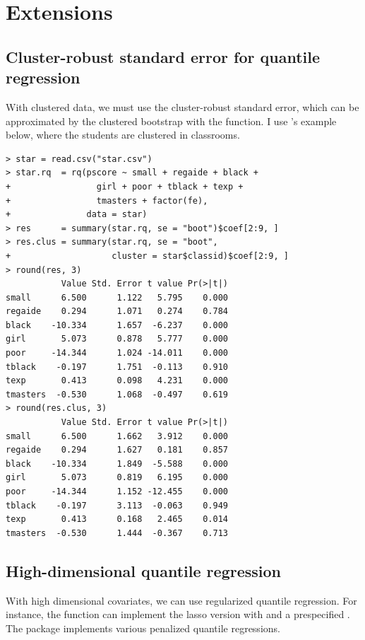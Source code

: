  



\section{Extensions}


\subsection{Cluster-robust standard error for quantile regression}

With clustered data, we must use the cluster-robust standard error, which can be approximated by the clustered bootstrap with the  function. I use \citet{hagemann2017cluster}'s example below, where the students are clustered in classrooms.


\begin{lstlisting}
> star = read.csv("star.csv")
> star.rq  = rq(pscore ~ small + regaide + black + 
+                 girl + poor + tblack + texp + 
+                 tmasters + factor(fe),
+               data = star)
> res      = summary(star.rq, se = "boot")$coef[2:9, ]
> res.clus = summary(star.rq, se = "boot", 
+                    cluster = star$classid)$coef[2:9, ]
> round(res, 3)
           Value Std. Error t value Pr(>|t|)
small      6.500      1.122   5.795    0.000
regaide    0.294      1.071   0.274    0.784
black    -10.334      1.657  -6.237    0.000
girl       5.073      0.878   5.777    0.000
poor     -14.344      1.024 -14.011    0.000
tblack    -0.197      1.751  -0.113    0.910
texp       0.413      0.098   4.231    0.000
tmasters  -0.530      1.068  -0.497    0.619
> round(res.clus, 3)
           Value Std. Error t value Pr(>|t|)
small      6.500      1.662   3.912    0.000
regaide    0.294      1.627   0.181    0.857
black    -10.334      1.849  -5.588    0.000
girl       5.073      0.819   6.195    0.000
poor     -14.344      1.152 -12.455    0.000
tblack    -0.197      3.113  -0.063    0.949
texp       0.413      0.168   2.465    0.014
tmasters  -0.530      1.444  -0.367    0.713
\end{lstlisting}




\subsection{High-dimensional quantile regression}

With high dimensional covariates, we can use regularized quantile regression. For instance, the  function can implement the lasso version with  and a prespecified . The  package  implements various penalized quantile regressions. 






